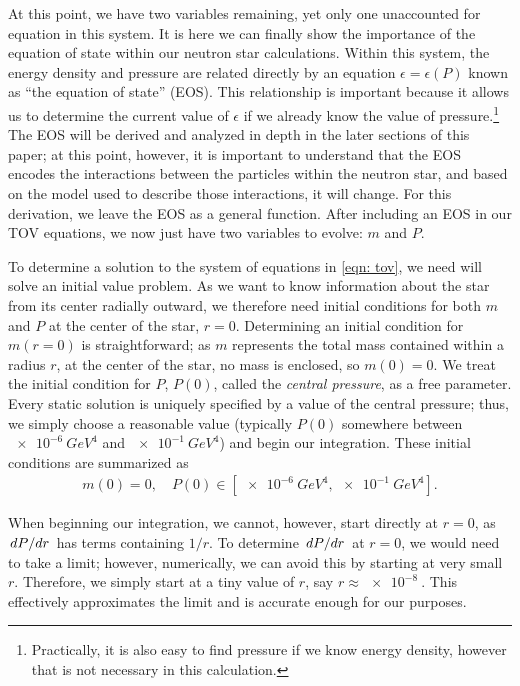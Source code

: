 At this point, we have two variables remaining, yet only one unaccounted for equation in this system. It is here we can finally show the importance of the equation of state within our neutron star calculations. Within this system, the energy density and pressure are related directly by an equation $\epsilon = \epsilon(P)$ known as ``the equation of state'' (EOS). This relationship is important because it allows us to determine the current value of $\epsilon$ if we already know the value of pressure.\footnote{ Practically, it is also easy to find pressure if we know energy density, however that is not necessary in this calculation.} The EOS will be derived and analyzed in depth in the later sections of this paper; at this point, however, it is important to understand that the EOS encodes the interactions between the particles within the neutron star, and based on the model used to describe those interactions, it will change. For this derivation, we leave the EOS as a general function. After including an EOS in our TOV equations, we now just have two variables to evolve: $m$ and $P$.

To determine a solution to the system of equations in \eqref{eqn: tov}, we need will solve an initial value problem. As we want to know information about the star from its center radially outward, we therefore need initial conditions for both $m$ and $P$ at the center of the star, $r=0$. Determining an initial condition for $m(r=0)$ is straightforward; as $m$ represents the total mass contained within a radius $r$, at the center of the star, no mass is enclosed, so $m(0)=0$. We treat the initial condition for $P$, $P(0)$, called the \textit{central pressure}, as a free parameter. Every static solution is uniquely specified by a value of the central pressure; thus, we simply choose a reasonable value (typically $P(0)$ somewhere between $\SI{e-6}{GeV^4}$ and $\SI{e-1}{GeV^4}$) and begin our integration. These initial conditions are summarized as
\begin{align}\label{eqn: tov ic}
    m(0) = 0, \quad P(0) \in [\SI{e-6}{GeV^4}, \SI{e-1}{GeV^4}].
\end{align}

When beginning our integration, we cannot, however, start directly at $r=0$, as $\dv*{P}{r}$ has terms containing $1/r$. To determine $\dv*{P}{r}$ at $r=0$, we would need to take a limit; however, numerically, we can avoid this by starting at very small $r$. Therefore, we simply start at a tiny value of $r$, say $r\approx\SI{e-8}{}$. This effectively approximates the limit and is accurate enough for our purposes.

